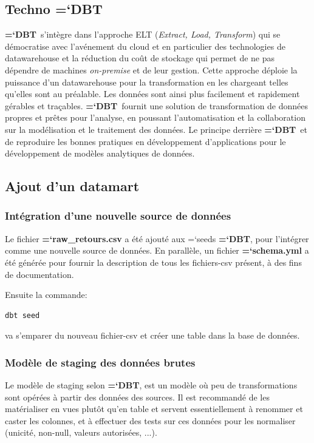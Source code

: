 \documentclass[11pt]{article}
\renewcommand{\emph}[1]{\textsl{#1}}
\newcommand{\techno}[1]{{\ttfamily\bfseries\hyphenchar\font=`\-\color{Sienna}#1}}
\newcommand{\fichier}[1]{\colorbox{backcolor}{\ttfamily\bfseries\hyphenchar\font=`\-\color{filecolor}#1}}
\newcommand{\folder}[1]{\colorbox{backcolor}{\ttfamily\hyphenchar\font=`\-\color{FireBrick}#1}}
\newcommand{\dbt}{\techno{DBT}}
\begin{document}
\subsection{Techno \dbt}

\dbt\ s'intègre dans l'approche ELT (\emph{Extract, Load, Transform}) qui se démocratise avec l'avénement du cloud et en particulier des technologies de datawarehouse et la réduction du coût de stockage qui permet de ne pas dépendre de machines \emph{on-premise} et de leur gestion. Cette approche déploie la puissance d'un datawarehouse pour la transformation en les chargeant telles qu'elles sont au préalable. Les données sont ainsi plus facilement et rapidement gérables et traçables. \dbt\ fournit une solution de transformation de données propres et prêtes pour l'analyse, en poussant l'automatisation et la collaboration sur la modélisation et le traitement des données. Le principe derrière \dbt\ et de reproduire les bonnes pratiques en développement d'applications pour le développement de modèles analytiques de données.

\subsection{Ajout d'un datamart}

\subsubsection{Intégration d'une nouvelle source de données}

Le fichier \fichier{raw\_retours.csv} a été ajouté aux \folder{seeds}
\dbt, pour l'intégrer comme une nouvelle source de données. En parallèle,
un fichier \fichier{schema.yml} a été générée pour fournir la description
de tous les fichiers-csv présent, à des fins de documentation.

Ensuite la commande:
\begin{lstlisting}[language=bash]
dbt seed
\end{lstlisting}
va s'emparer du nouveau fichier-csv et créer une table dans la base
de données.

\subsubsection{Modèle de staging des données brutes}

Le modèle de staging selon \dbt, est un modèle où peu de transformations sont opérées à partir des données des sources. Il est recommandé de les matérialiser en vues plutôt qu'en table et servent essentiellement à renommer et caster les colonnes, et à effectuer des tests sur ces données pour les normaliser (unicité, non-null, valeurs autorisées, ...).
\end{document}
